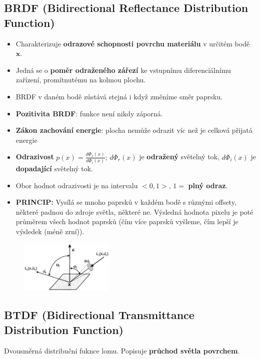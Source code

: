 \subsection{BRDF (Bidirectional Reflectance Distribution Function)}
\begin{itemize}
	\item Charakterizuje \textbf{odrazové schopnosti povrchu materiálu} v určitém bodě $\mathbf{x}$.
	\item Jedná se o \textbf{poměr odraženého zářezí} ke vstupnímu diferenciálnímu zařízení, promítnutému na kolmou plochu.
	\item BRDF v daném bodě zůstává stejná i když změníme směr paprsku.
	\item \textbf{Pozitivita BRDF}: funkce není nikdy záporná.
	\item \textbf{Zákon zachování energie}: plocha nemůže odrazit víc než je celková přijatá energie
	\item \textbf{Odrazivost} $p(x) = \frac{d\Phi_r(x)}{d\Phi_i(x)}; \, d\Phi_r(x)$ je \textbf{odražený} světelný tok, $d\Phi_i(x)$ je \textbf{dopadající} světelný tok.
	\item Obor hodnot odrazivosti je na intervalu $<0,1>, \, 1=$ \textbf{plný odraz}.
	\item \textbf{PRINCIP:} Vysílá se mnoho paprsků v každém bodě s různými offsety, některé padnou do zdroje světla, některé ne. Výsledná hodnota pixelu je poté průměrem všech hodnot paprsků (čím více paprsků vyšleme, čím lepší je výsledek (méně zrní)).
\end{itemize}
\begin{figure}[H]
\centering
\includegraphics[width=0.4\textwidth]{assets/6_brdf}
\end{figure}
\subsection{BTDF (Bidirectional Transmittance Distribution Function)}
Dvousměrná distribuční fuknce lomu. Popisuje \textbf{průchod světla povrchem}.

